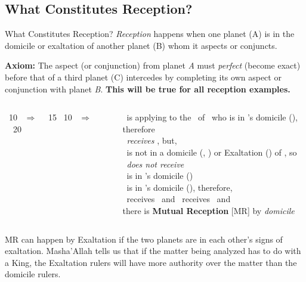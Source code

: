 \subsection{What Constitutes Reception?}
\begin{frame}[t]{What Constitutes Reception?}
\small
\textsl{Reception} happens when one planet (A) is in the domicile or exaltation of another planet (B) whom it aspects or conjuncts.

\textbf{Axiom:} {The aspect (or conjunction) from planet \textsl{A} must \textsl{perfect} (become exact)  before that of a third planet (C) intercedes by completing its own aspect or conjunction with planet \textsl{B}. \textbf{This will be true for all reception examples.}}
\vspace{0.1cm}
\begin{columns}[T, onlytextwidth]
\Mars\ 10 \Aries\ $\Rightarrow$ \Conjunction\ \Saturn\ 15 \Aries
\vspace{1.5cm}
\Mars\ 10 \Capricorn\ $\Rightarrow$ \Square\ \Saturn\ 20 \Aries

\rule{.1mm}{.4\textheight}

\Mars\ is applying to the \Conjunction\ of \Saturn\ who is in \Mars's domicile (\Aries), therefore\\
\Mars\ \textsl{receives} \Saturn, but, \\
\Mars\ is not in a domicile (\Capricorn, \Aquarius) or Exaltation (\Libra) of \Saturn, so \\
\Saturn\ \textsl{does not receive} \Mars \\
\vspace{0.1cm}
\ul
\Mars\ is in \Saturn's domicile (\Capricorn) \\
\Saturn\ is in \Mars's domicile (\Aries), therefore, \\
\Mars\ receives \Saturn\ and \Saturn\ receives \Mars\ and \\
there is \textbf{Mutual Reception} [MR] by \textsl{domicile}
\end{columns}
\vspace{0.2cm}
 MR can happen by Exaltation if the two planets are in each other's signs of exaltation. Masha'Allah tells us that if the matter being analyzed has to do with a King, the Exaltation rulers will have more authority over the matter than the domicile rulers.
\end{frame}